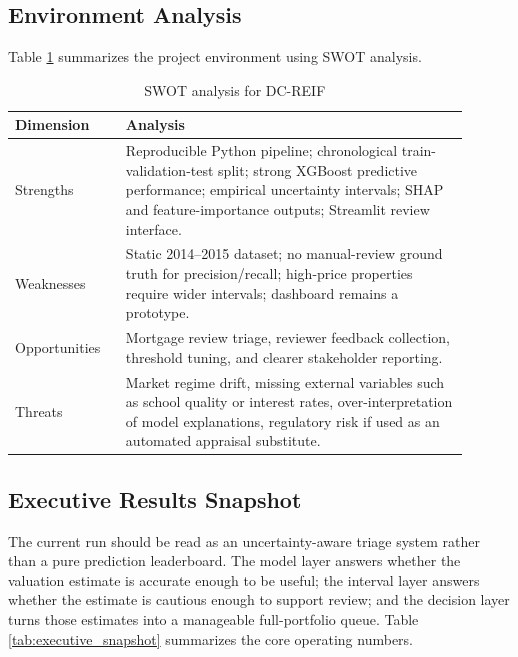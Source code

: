 \documentclass[12pt,a4paper]{article}
\begin{document}
\subsection{Environment Analysis}
Table \ref{tab:swot} summarizes the project environment using SWOT analysis.

\begin{table}[H]
\centering
\caption{SWOT analysis for DC-REIF}
\label{tab:swot}
\begin{tabular}{p{0.22\linewidth}p{0.68\linewidth}}
\toprule
\textbf{Dimension} & \textbf{Analysis}\\
\midrule
Strengths & Reproducible Python pipeline; chronological train-validation-test split; strong XGBoost predictive performance; empirical uncertainty intervals; SHAP and feature-importance outputs; Streamlit review interface.\\
Weaknesses & Static 2014--2015 dataset; no manual-review ground truth for precision/recall; high-price properties require wider intervals; dashboard remains a prototype.\\
Opportunities & Mortgage review triage, reviewer feedback collection, threshold tuning, and clearer stakeholder reporting.\\
Threats & Market regime drift, missing external variables such as school quality or interest rates, over-interpretation of model explanations, regulatory risk if used as an automated appraisal substitute.\\
\bottomrule
\end{tabular}
\end{table}

\subsection{Executive Results Snapshot}
The current run should be read as an uncertainty-aware triage system rather than a pure prediction leaderboard. The model layer answers whether the valuation estimate is accurate enough to be useful; the interval layer answers whether the estimate is cautious enough to support review; and the decision layer turns those estimates into a manageable full-portfolio queue. Table \ref{tab:executive_snapshot} summarizes the core operating numbers.
\end{document}
